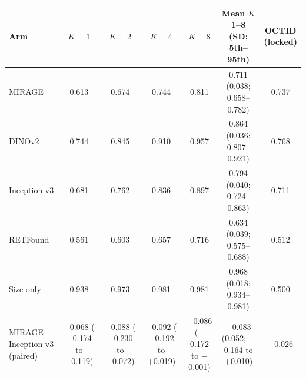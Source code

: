 \begin{tabular}{@{}lcccccc@{}}
\toprule
Arm & $K=1$ & $K=2$ & $K=4$ & $K=8$ & \makecell{Mean $K$ 1--8\\(SD; 5th--95th)} & \makecell{OCTID\\(locked)} \\
\midrule
MIRAGE & 0.613 & 0.674 & 0.744 & 0.811 & \makecell{0.711\\{\scriptsize (0.038; 0.658--0.782)}} & 0.737 \\
DINOv2 & 0.744 & 0.845 & 0.910 & 0.957 & \makecell{0.864\\{\scriptsize (0.036; 0.807--0.921)}} & 0.768 \\
Inception-v3 & 0.681 & 0.762 & 0.836 & 0.897 & \makecell{0.794\\{\scriptsize (0.040; 0.724--0.863)}} & 0.711 \\
RETFound & 0.561 & 0.603 & 0.657 & 0.716 & \makecell{0.634\\{\scriptsize (0.039; 0.575--0.688)}} & 0.512 \\
Size-only & 0.938 & 0.973 & 0.981 & 0.981 & \makecell{0.968\\{\scriptsize (0.018; 0.934--0.981)}} & 0.500 \\
\midrule
\makecell[l]{MIRAGE $-$\\Inception-v3 (paired)} & \makecell{$-$0.068\\{\scriptsize ($-$0.174 to +0.119)}} & \makecell{$-$0.088\\{\scriptsize ($-$0.230 to +0.072)}} & \makecell{$-$0.092\\{\scriptsize ($-$0.192 to +0.019)}} & \makecell{$-$0.086\\{\scriptsize ($-$0.172 to $-$0.001)}} & \makecell{$-$0.083\\{\scriptsize (0.052; $-$0.164 to +0.010)}} & +0.026 \\
\bottomrule
\end{tabular}
